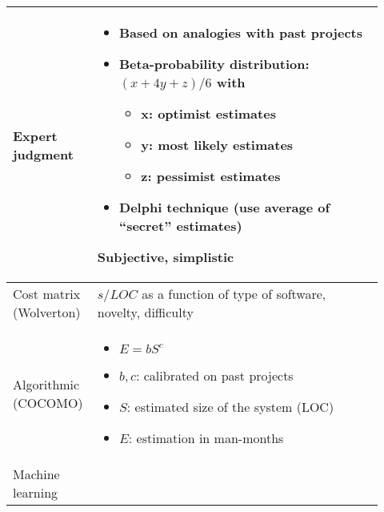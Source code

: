 \begin{table}[!ht]
    \begin{tabular}{p{0.17\linewidth}p{0.75\linewidth}}
        \toprule
        Expert judgment & \begin{minipage}{\linewidth}\begin{itemize}
                            \item Based on analogies with past projects
                            \item Beta-probability distribution: $(x+4y+z)/6$ with
                                \begin{itemize}
                                    \item x: optimist estimates
                                    \item y: most likely estimates
                                    \item z: pessimist estimates
                                \end{itemize}
                            \item Delphi technique (use average of \enquote{secret}
                            estimates)
                          \end{itemize}
                          Subjective, simplistic\end{minipage} \\
        \midrule
        Cost matrix (Wolverton) &   $s/LOC$ as a function of type of software,
                                    novelty, difficulty \\
        \midrule
        Algorithmic (COCOMO) & \begin{minipage}{\linewidth}\begin{itemize}
                                    \item $E = b {S}^{c}$
                                    \item $b,c$: calibrated on past projects
                                    \item $S$: estimated size of the system (LOC)
                                    \item $E$: estimation in man-months
                               \end{itemize}\end{minipage} \\
        \midrule
        Machine learning &  \begin{minipage}{\linewidth}\begin{itemize}

\end{itemize}
\end{minipage}
\end{tabular}
\end{table}
